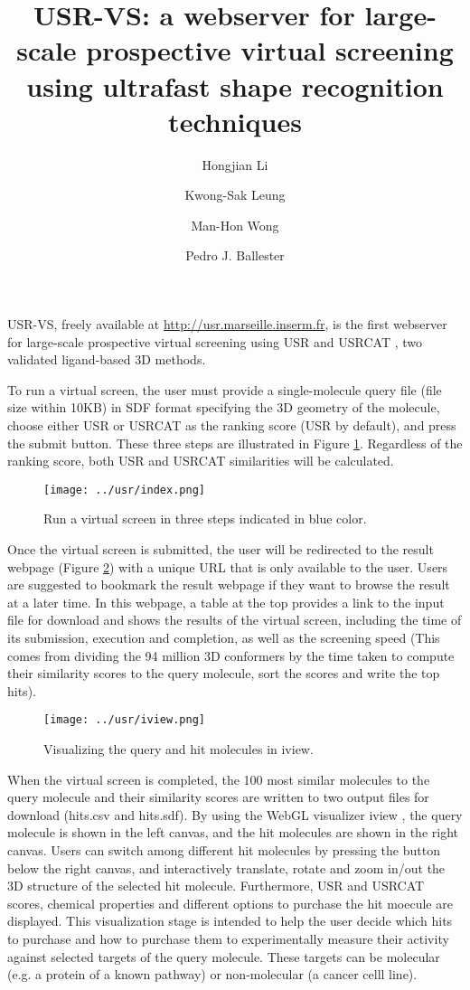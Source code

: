\documentclass[a4paper,11pt]{article}
\title{USR-VS: a webserver for large-scale prospective virtual screening using ultrafast shape recognition techniques}
\author[1]{Hongjian Li}
\author[1]{Kwong-Sak Leung}
\author[1]{Man-Hon Wong}
\author[2]{Pedro J. Ballester}
\affil[1]{Department of Computer Science and Engineering, Chinese University of Hong Kong.}
\affil[ ]{\{hjli,ksleung,mhwong\}@cse.cuhk.edu.hk}
\affil[2]{Cancer Research Center of Marseille, INSERM U1068; Institut Paoli-Calmettes; Aix-Marseille Universit\'{e}; CNRS UMR7258, Marseille, France.}
\affil[ ]{pedro.ballester@inserm.fr}
\begin{document}
\maketitle
\thispagestyle{title}

USR-VS, freely available at \url{http://usr.marseille.inserm.fr}, is the first webserver for large-scale prospective virtual screening using USR \cite{1379} and USRCAT \cite{1331}, two validated ligand-based 3D methods.

To run a virtual screen, the user must provide a single-molecule query file (file size within 10KB) in SDF format specifying the 3D geometry of the molecule, choose either USR or USRCAT as the ranking score (USR by default), and press the submit button. These three steps are illustrated in Figure \ref{index}. Regardless of the ranking score, both USR and USRCAT similarities will be calculated.

\begin{figure}
\texttt{[image: ../usr/index.png]}
\caption{Run a virtual screen in three steps indicated in blue color.}
\label{index}
\end{figure}

Once the virtual screen is submitted, the user will be redirected to the result webpage (Figure \ref{iview}) with a unique URL that is only available to the user. Users are suggested to bookmark the result webpage if they want to browse the result at a later time. In this webpage, a table at the top provides a link to the input file for download and shows the results of the virtual screen, including the time of its submission, execution and completion, as well as the screening speed (This comes from dividing the 94 million 3D conformers by the time taken to compute their similarity scores to the query molecule, sort the scores and write the top hits).

\begin{figure}
\texttt{[image: ../usr/iview.png]}
\caption{Visualizing the query and hit molecules in iview.}
\label{iview}
\end{figure}

When the virtual screen is completed, the 100 most similar molecules to the query molecule and their similarity scores are written to two output files for download (hits.csv and hits.sdf). By using the WebGL visualizer iview \cite{1366}, the query molecule is shown in the left canvas, and the hit molecules are shown in the right canvas. Users can switch among different hit molecules by pressing the button below the right canvas, and interactively translate, rotate and zoom in/out the 3D structure of the selected hit molecule. Furthermore, USR and USRCAT scores, chemical properties and different options to purchase the hit moecule are displayed. This visualization stage is intended to help the user decide which hits to purchase and how to purchase them to experimentally measure their activity against selected targets of the query molecule. These targets can be molecular (e.g. a protein of a known pathway) or non-molecular (a cancer celll line).



\end{document}
